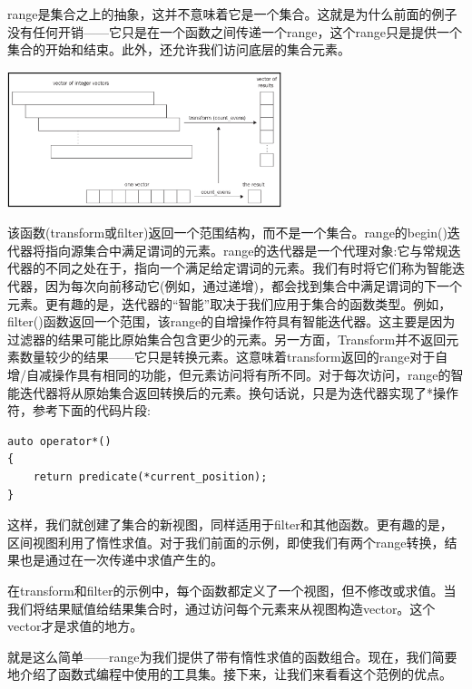 range是集合之上的抽象，这并不意味着它是一个集合。这就是为什么前面的例子没有任何开销——它只是在一个函数之间传递一个range，这个range只是提供一个集合的开始和结束。此外，还允许我们访问底层的集合元素。 \par

\begin{center}
	\includegraphics[width=0.6\textwidth]{content/Section-2/Chapter-7/3}
\end{center}

该函数(transform或filter)返回一个范围结构，而不是一个集合。range的begin()迭代器将指向源集合中满足谓词的元素。range的迭代器是一个代理对象:它与常规迭代器的不同之处在于，指向一个满足给定谓词的元素。我们有时将它们称为智能迭代器，因为每次向前移动它(例如，通过递增)，都会找到集合中满足谓词的下一个元素。更有趣的是，迭代器的“智能”取决于我们应用于集合的函数类型。例如，filter()函数返回一个范围，该range的自增操作符具有智能迭代器。这主要是因为过滤器的结果可能比原始集合包含更少的元素。另一方面，Transform并不返回元素数量较少的结果——它只是转换元素。这意味着transform返回的range对于自增/自减操作具有相同的功能，但元素访问将有所不同。对于每次访问，range的智能迭代器将从原始集合返回转换后的元素。换句话说，只是为迭代器实现了*操作符，参考下面的代码片段: \par

\begin{lstlisting}[caption={}]
auto operator*()
{
	return predicate(*current_position);
}
\end{lstlisting}

这样，我们就创建了集合的新视图，同样适用于filter和其他函数。更有趣的是，区间视图利用了惰性求值。对于我们前面的示例，即使我们有两个range转换，结果也是通过在一次传递中求值产生的。\par
在transform和filter的示例中，每个函数都定义了一个视图，但不修改或求值。当我们将结果赋值给结果集合时，通过访问每个元素来从视图构造vector。这个vector才是求值的地方。 \par
就是这么简单——range为我们提供了带有惰性求值的函数组合。现在，我们简要地介绍了函数式编程中使用的工具集。接下来，让我们来看看这个范例的优点。 \par

